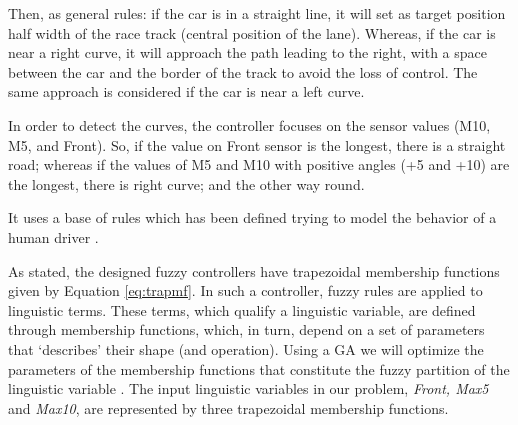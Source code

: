 \documentclass[conference]{IEEEtran}
\begin{document}
Then, as general rules: if the car is in a straight line, it will set as target position half width of the race track (central position of the lane). Whereas, if the car is near a right curve, it will approach the path leading to the right, with a space between the car and the border of the track to avoid the loss of control. The same approach is considered if the car is near a left curve.

In order to detect the curves, the controller focuses on the sensor values (M10, M5, and Front). So, if the value on Front sensor is the longest, there is a straight road; whereas if the values of M5 and M10 with positive angles (+5 and +10) are the longest, there is right curve; and the other way round.

It uses a base of rules which has been defined trying to model the behavior of a human driver \cite{salem_evo17}.






As stated, the designed fuzzy controllers have trapezoidal membership functions given by Equation \ref{eq:trapmf}.
In such a controller, fuzzy rules are applied to linguistic
terms. These terms, which qualify a linguistic variable, are defined
through membership functions, which, in turn, depend on a set of
parameters that `describes' their shape (and operation). Using a GA we
will optimize the parameters of the membership functions that
constitute the fuzzy partition of the linguistic variable
\cite{ThangG08}. The input linguistic variables in our problem,
\textit{Front, Max5} and \textit{Max10}, are represented by three
trapezoidal membership functions. 
\end{document}
